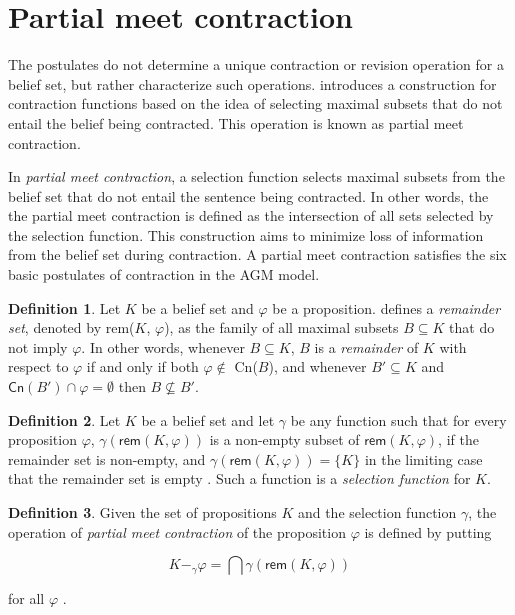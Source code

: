 \section{Partial meet contraction}

The postulates do not determine a unique contraction or revision operation for a belief set, but rather characterize such operations. \citet{AGM1985} introduces a construction for contraction functions based on the idea of selecting maximal subsets that do not entail the belief being contracted. This operation is known as partial meet contraction.

In \textit{partial meet contraction}, a selection function selects maximal subsets from the belief set that do not entail the sentence being contracted. In other words, the the partial meet contraction is defined as the intersection of all sets selected by the selection function. This construction aims to minimize loss of information from the belief set during contraction. A partial meet contraction satisfies the six basic postulates of contraction in the AGM model.

\theoremstyle{definition}
\newtheorem{definition}{Definition}[chapter]

\begin{definition}
    Let $K$ be a belief set and $\varphi$ be a proposition. \citet{AM1981} defines a \textit{remainder set}, denoted by \textsf{rem}($K$, $\varphi$), as the family of all maximal subsets $B \subseteq K$ that do not imply $\varphi$. In other words, whenever $B \subseteq K$, $B$ is a \textit{remainder} of $K$ with respect to $\varphi$ if and only if both $\varphi \notin$ \textsf{Cn}($B$), and whenever $B' \subseteq K$ and $\textsf{Cn}(B') \cap \varphi = \emptyset$ then $B \not \subseteq B'$.
\end{definition}

\begin{definition}
    Let $K$ be a belief set and let $\gamma$ be any function such that for every proposition $\varphi$, $\gamma(\textsf{rem}(K, \varphi))$ is a non-empty subset of $\textsf{rem}(K, \varphi)$, if the remainder set is non-empty, and $\gamma(\textsf{rem}(K, \varphi)) = \{ K \}$ in the limiting case that the remainder set is empty \citep{AGM1985}. Such a function is a \textit{selection function} for $K$.
\end{definition}

\begin{definition}
    Given the set of propositions $K$ and the selection function $\gamma$, the operation of \textit{partial meet contraction} of the proposition $\varphi$ is defined by putting

    $$K -_{\gamma} \varphi = \bigcap \gamma(\textsf{rem}(K, \varphi))$$

    for all $\varphi$ \citep{AGM1985}.
\end{definition}

